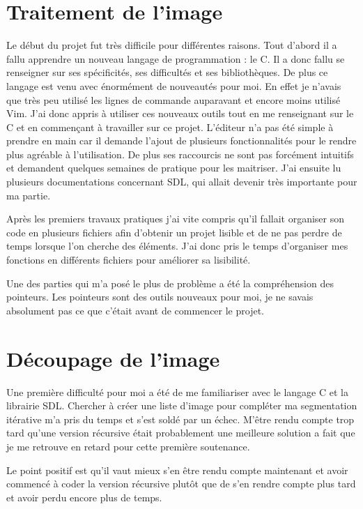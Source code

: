 \documentclass[12pt]{report}
\begin{document}
\section*{Traitement de l'image}

Le début du projet fut très difficile pour différentes raisons. Tout d’abord il a fallu apprendre un nouveau langage de programmation : le C. Il a donc fallu se renseigner sur ses spécificités, ses difficultés et ses bibliothèques. De plus ce langage est venu avec énormément de nouveautés pour moi. En effet je n’avais que très peu utilisé les lignes de commande auparavant et encore moins utilisé Vim. J’ai donc appris à utiliser ces nouveaux outils tout en me renseignant sur le C et en commençant à travailler sur ce projet. L'éditeur n’a pas été simple à prendre en main car il demande l’ajout de plusieurs fonctionnalités pour le rendre plus agréable à l’utilisation. De plus ses raccourcis ne sont pas forcément intuitifs et demandent quelques semaines de pratique pour les maitriser. J’ai ensuite lu plusieurs documentations concernant SDL, qui allait devenir très importante pour ma partie. 

Après les premiers travaux pratiques j’ai vite compris qu’il fallait organiser son code en plusieurs fichiers afin d’obtenir un projet lisible et de ne pas perdre de temps lorsque l’on cherche des éléments. J’ai donc pris le temps d’organiser mes fonctions en différents fichiers pour améliorer sa lisibilité. 

Une des parties qui m’a posé le plus de problème a été la compréhension des pointeurs. Les pointeurs sont des outils nouveaux pour moi, je ne savais absolument pas ce que c’était avant de commencer le projet.  

\section*{Découpage de l'image}

Une première difficulté pour moi a été de me familiariser avec le langage C et la librairie SDL. Chercher à créer une liste d'image pour compléter ma segmentation itérative m'a pris du temps et s'est soldé par un échec. M'être rendu compte trop tard qu'une version récursive était probablement une meilleure solution a fait que je me retrouve en retard pour cette première soutenance.

Le point positif est qu'il vaut mieux s'en être rendu compte maintenant et avoir commencé à coder la version récursive plutôt que de s'en rendre compte plus tard et avoir perdu encore plus de temps.
\end{document}
